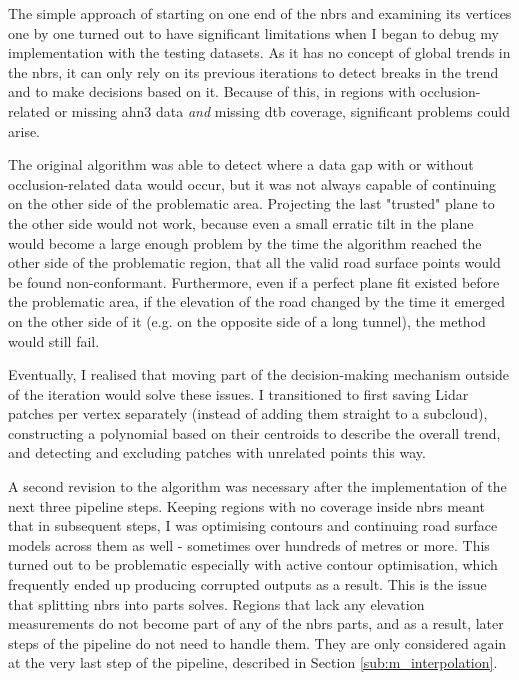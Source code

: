 The simple approach of starting on one end of the \ac{nbrs} and examining its vertices one by one turned out to have significant limitations when I began to debug my implementation with the testing datasets. As it has no concept of global trends in the \ac{nbrs}, it can only rely on its previous iterations to detect breaks in the trend and to make decisions based on it. Because of this, in regions with occlusion-related or missing \ac{ahn3} data \textit{and} missing \ac{dtb} coverage, significant problems could arise.

The original algorithm was able to detect where a data gap with or without occlusion-related data would occur, but it was not always capable of continuing on the other side of the problematic area. Projecting the last "trusted" plane to the other side would not work, because even a small erratic tilt in the plane would become a large enough problem by the time the algorithm reached the other side of the problematic region, that all the valid road surface points would be found non-conformant. Furthermore, even if a perfect plane fit existed before the problematic area, if the elevation of the road changed by the time it emerged on the other side of it (e.g. on the opposite side of a long tunnel), the method would still fail.

Eventually, I realised that moving part of the decision-making mechanism outside of the iteration would solve these issues. I transitioned to first saving Lidar patches per vertex separately (instead of adding them straight to a subcloud), constructing a polynomial based on their centroids to describe the overall trend, and detecting and excluding patches with unrelated points this way.

A second revision to the algorithm was necessary after the implementation of the next three pipeline steps. Keeping regions with no coverage inside \ac{nbrs} meant that in subsequent steps, I was optimising contours and continuing road surface models across them as well - sometimes over hundreds of metres or more. This turned out to be problematic especially with active contour optimisation, which frequently ended up producing corrupted outputs as a result. This is the issue that splitting \ac{nbrs} into parts solves. Regions that lack any elevation measurements do not become part of any of the \ac{nbrs} parts, and as a result, later steps of the pipeline do not need to handle them. They are only considered again at the very last step of the pipeline, described in Section \ref{sub:m_interpolation}.

